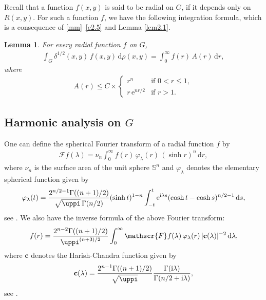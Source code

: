 \documentclass[a4paper,12pt]{amsart}
\numberwithin{equation}{section}
\newtheorem{lemma}[theorem]{Lemma}
\theoremstyle{definition}
\theoremstyle{remark}
\numberwithin{theorem}{section}
\newcommand{\e}{\mathrm{e}}
\newcommand{\bc}{\mathbf{c}}
\newcommand{\F}{\mathscr{F}}
\renewcommand{\SS}{\mathbb{S}}
\renewcommand{\i}{\mathrm{i}}
\renewcommand{\d}{\mathrm{d}}
\begin{document}
Recall that a function $f(x,y)$ is said to be radial on $G$, if it depends only on $R(x,y)$. For such a function $f$, we have the following integration formula, which is a consequence of \eqref{mm}--\eqref{e2.5} and Lemma \ref{lem2.1}.
\begin{lemma}\label{lem2.2}
For every radial function $f$ on $G$,
\begin{align*}
\int_G \delta^{1/2}(x,y)\,f(x,y)\,\d\rho(x,y)=\int_0^\infty f(r)\,A(r)\,\d r,
\end{align*}
where
\begin{align*}
A(r)\leq C\times\begin{cases}
r^n&\mbox{if }0<r\leq 1,\\
r\,\e^{nr/2}&\mbox{if }r>1.
\end{cases}
\end{align*}
\end{lemma}
\smallskip


\subsection{Harmonic analysis on \texorpdfstring{$G$}{G}}\label{sec3}
One can define the spherical Fourier transform of a radial function $f$ by
\begin{align}\label{e2.9}
\F f(\lambda)=\nu_n\int_0^\infty f(r)\, \varphi_\lambda(r)\,(\sinh r)^n\,\d r,
\end{align}
where $\nu_n$ is the surface area of the unit sphere $\SS^n$ and $\varphi_{\lambda}$ denotes the elementary spherical function given by
\begin{align}\label{e2.10}
\varphi_\lambda(t)={2^{n/2-1}\Gamma((n+1)/2)\over \sqrt{\uppi}\,\Gamma(n/2)} (\sinh t)^{1-n}\int_{-t}^t\e^{\i \lambda s}(\cosh t-\cosh s)^{n/2-1}\,\d s,
\end{align}
see \cite[(3.1.4)]{Br}. We also have the inverse formula of the above Fourier transform:
\begin{align*}
f(r)={2^{n-2}\Gamma((n+1)/2)\over\uppi^{(n+3)/2}}\int_0^\infty \F f(\lambda)\,\varphi_\lambda(r)\,|\bc(\lambda)|^{-2}\,\d\lambda,
\end{align*}
where $\bc$ denotes the Harish-Chandra function given by
\begin{align}\label{e2.11}
\bc(\lambda)={2^{n-1}\Gamma((n+1)/2)\over\sqrt{\uppi}}{\Gamma(\i\lambda)\over \Gamma(n/2+\i\lambda)},
\end{align}
see \cite[(3.1.3)]{Br}.
\smallskip
\end{document}
